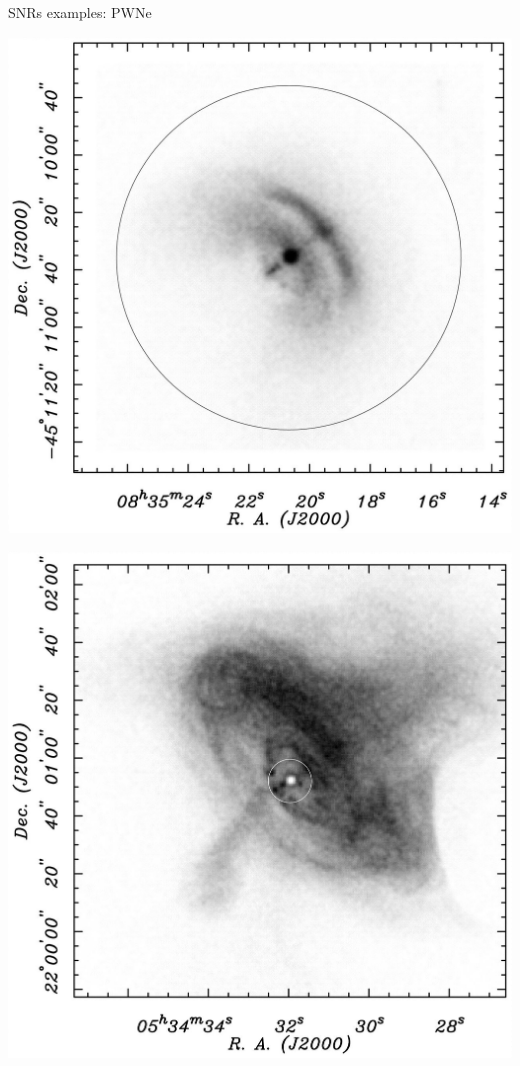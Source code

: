 \begin{frame}{SNRs examples: PWNe}

\begin{minipage}[t]{0.45\textwidth}
  \begin{center}
    \includegraphics[width=\textwidth,height=!]{./E/fg3a_helfand.jpg}
    \end{center}
\end{minipage}
\begin{minipage}[t]{0.54\textwidth}
  \begin{center}
    \includegraphics[width=\textwidth,height=!]{./E/fg3b_helfand.jpg}

\end{center}
\end{minipage}
\end{frame}
